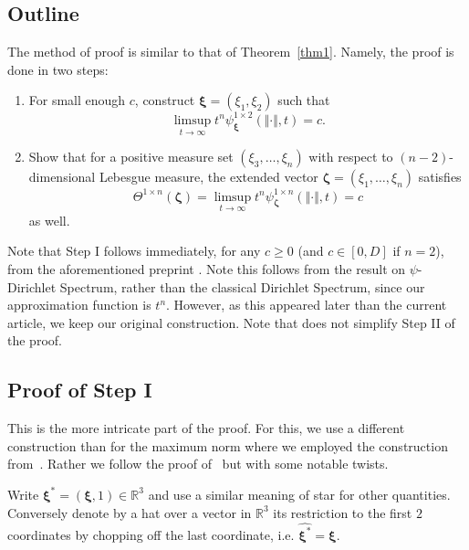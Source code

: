 \documentclass[10pt]{amsart}
\theoremstyle{definition}
\newcommand{\ux}{\boldsymbol{\xi}}
\newcommand{\uz}{\boldsymbol{\zeta}}
\newcommand{\uxs}{\boldsymbol{\xi}^{\ast}}
\newcommand{\R}{\mathbb{R}}
\begin{document}
\subsection{Outline}
The method of proof is similar to that of Theorem~\ref{thm1}. Namely, the proof is done in two steps:
\begin{enumerate}
\item[Step I:] For small enough $c$, construct $\ux=(\xi_1, \xi_2)$ such that
\[
\limsup_{t\to\infty} t^n \psi_{\ux}^{1\times 2}(\Vert\cdot\Vert,t) = c.
\]
\item[Step II:] Show that for a positive measure set $(\xi_3,\ldots,\xi_n)$ with respect
to $(n-2)$-dimensional Lebesgue measure, the extended vector $\uz=(\xi_1,\ldots,\xi_n)$ satisfies
\[
\Theta^{1\times n}(\uz)=\limsup_{t\to\infty} t^n \psi_{\uz}^{1\times n}(\Vert\cdot\Vert,t) = c
\]
 as well.
\end{enumerate}
 Note that Step I follows immediately, for
any $c\ge 0$ (and $c\in[0,D]$ if $n=2$),
from the aforementioned preprint \cite[Corollary~1]{AginWeiss2024}. Note this follows from the result on  $\psi$-Dirichlet Spectrum, rather than the classical Dirichlet Spectrum, since our approximation function is $t^{n}$. However, as this appeared later than the current article, we keep our original construction. Note that \cite{AginWeiss2024} does not simplify Step II of the proof.


\subsection{Proof of Step I}  \label{st1}
This is the more intricate part of the proof. For this, we use a different construction than for the maximum norm where we employed the construction from~\cite{j2}. 
Rather we follow the proof of~\cite[Theorem~2.1]{j3} but with some notable twists. 

Write $\uxs=(\ux,1)\in\R^{3}$ and use a similar meaning of star for other 
quantities. Conversely denote by a hat over a vector in $\R^{3}$ its restriction to the first
$2$ coordinates by chopping off the last coordinate, i.e. $\widehat{\uxs}=\ux$.
\end{document}
